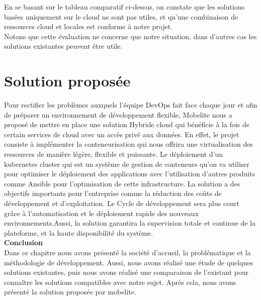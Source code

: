  En se basant sur le tableau comparatif ci-dessus, on constate que les solutions basées uniquement sur le cloud ne sont pas utiles, et qu'une combinaison de ressources cloud et locales est conforme à notre projet.\\[0.1cm]
Notons que cette évaluation ne concerne que notre situation, dans d'autres cas les solutions existantes peuvent être utile.  

\section{\selectfont\Large Solution proposée}%
 Pour rectifier les problèmes auxquels l’équipe DevOps fait face chaque jour et afin de  préparer un environnement de développement flexible, Mobelite nous a proposé de mettre en place une solution Hybride cloud qui bénéficie à la fois  de certain services de cloud avec un accès privé aux données. En effet, le projet consiste à implémenter la conteneurisation qui nous offrira une virtualisation des ressources de manière légère, flexible et puissante. Le déploiement d’un kubernetes cluster qui est un système de gestion de conteneurs qu'on va utiliser pour optimiser le déploiement des applications avec l’utilisation d’autres produits comme Ansible pour l’optimisation de cette infrastructure. La solution a des objectifs importants pour l’entreprise comme la réduction des coûts de développement et d'exploitation. Le Cycle de développement sera plus court grâce à l'automatisation et le déploiement rapide des nouveaux environnements.Aussi, la solution garantira la supervision totale et continue de la plateforme, et la haute disponibilité du système.\\[0.1cm]


\textbf{\huge Conclusion} \\[0.3cm]  

 Dans ce chapitre nous avons présenté la société d’accueil, la problématique et la méthodologie de développement.
    Aussi, nous avons réalisé une étude de quelques solutions existantes,
puis nous avons réalisé une comparaison de l'existant pour connaître les solutions
compatibles avec notre sujet. Après cela, nous avons présenté la solution proposée
par mobelite.
